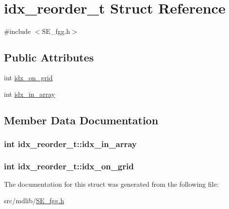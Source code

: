 \hypertarget{structidx__reorder__t}{\section{idx\-\_\-reorder\-\_\-t \-Struct \-Reference}
\label{structidx__reorder__t}
}


{\ttfamily \#include $<$\-S\-E\-\_\-fgg.\-h$>$}

\subsection*{\-Public \-Attributes}
\begin{DoxyCompactItemize}
\item 
int \hyperlink{structidx__reorder__t_aa371004742db01b1fbd4f0c142f3cc54}{idx\-\_\-on\-\_\-grid}
\item 
int \hyperlink{structidx__reorder__t_a1f80b050bc38260cdd9e214417e92266}{idx\-\_\-in\-\_\-array}
\end{DoxyCompactItemize}


\subsection{\-Member \-Data \-Documentation}
\hypertarget{structidx__reorder__t_a1f80b050bc38260cdd9e214417e92266}{
\subsubsection[{idx\-\_\-in\-\_\-array}]{\setlength{\rightskip}{0pt plus 5cm}int {\bf idx\-\_\-reorder\-\_\-t\-::idx\-\_\-in\-\_\-array}}}\label{structidx__reorder__t_a1f80b050bc38260cdd9e214417e92266}
\hypertarget{structidx__reorder__t_aa371004742db01b1fbd4f0c142f3cc54}{
\subsubsection[{idx\-\_\-on\-\_\-grid}]{\setlength{\rightskip}{0pt plus 5cm}int {\bf idx\-\_\-reorder\-\_\-t\-::idx\-\_\-on\-\_\-grid}}}\label{structidx__reorder__t_aa371004742db01b1fbd4f0c142f3cc54}


\-The documentation for this struct was generated from the following file\-:\begin{DoxyCompactItemize}
\item 
src/mdlib/\hyperlink{SE__fgg_8h}{\-S\-E\-\_\-fgg.\-h}\end{DoxyCompactItemize}
